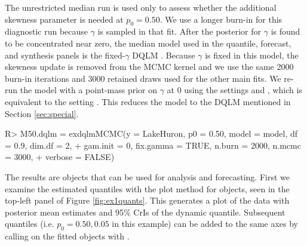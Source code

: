 \documentclass{jss}
\begin{document}
The unrestricted median run is used only to assess whether the additional skewness parameter is needed at \(p_0=0.50\). We use a longer burn-in for this diagnostic run because \(\gamma\) is sampled in that fit. After the posterior for \(\gamma\) is found to be concentrated near zero, the median model used in the quantile, forecast, and synthesis panels is the fixed-\(\gamma\) DQLM . Because \(\gamma\) is fixed in this model, the skewness update is removed from the MCMC kernel and we use the same 2000 burn-in iterations and 3000 retained draws used for the other main fits. We re-run the model with a point-mass prior on $\gamma$ at 0 using the settings  and , which is equivalent to the setting . This reduces the model to the DQLM mentioned in Section \ref{sec:special}.

\begin{CodeChunk}
\begin{CodeInput}
R> M50.dqlm = exdqlmMCMC(y = LakeHuron, p0 = 0.50, model = model, df = 0.9, dim.df = 2,
+             gam.init = 0, fix.gamma = TRUE, n.burn = 2000, n.mcmc = 3000,
+             verbose = FALSE)
\end{CodeInput}
\end{CodeChunk}

The results are  objects that can be used for analysis and forecasting. First we examine the estimated quantiles with the plot method for  objects, seen in the top-left panel of Figure \ref{fig:ex1quants}. This generates a plot of the data with posterior mean estimates and 95\% CrIs of the dynamic quantile. Subsequent quantiles (i.e. $p_0 = 0.50, 0.05$ in this example) can be added to the same axes by calling  on the fitted objects with .
\end{document}
